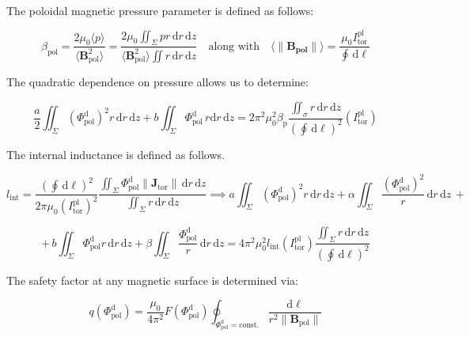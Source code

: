 The poloidal magnetic pressure parameter is defined as follows:

\begin{equation}
    \beta_\text{pol}=\frac{2\mu_0\langle p\rangle}{\langle\mathbf{B}_\text{pol}^2\rangle}=\frac{2\mu_0\iint_\Sigma pr\,\mathrm{d}r\,\mathrm{d}z}{\langle\mathbf B_\text{pol}^2\rangle\iint r\,\mathrm{d}r\,\mathrm{d}z}\quad\text{along with}\quad\langle\mathbf{\|\mathbf{B}_\text{pol}\|\rangle}=\frac{\mu_0I_\text{tor}^\text{pl}}{\oint\,\mathrm{d}\ell}
\end{equation}

The quadratic dependence on pressure allows us to determine:

\begin{equation}
    \frac{a}{2}\iint_\Sigma\left(\Phi_\text{pol}^\mathrm{d}\right)^2r\,\mathrm{d}r\,\mathrm{d}z+b\iint_\Sigma\Phi_\text{pol}^\mathrm{d}\,r\mathrm{d}r\,\mathrm{d}z=2\pi^2\mu_0^2\beta_\text{p}\frac{\iint_\sigma r\,\mathrm{d}r\,\mathrm{d}z}{\left(\oint\,\mathrm{d}\ell\right)^2}\left(I_\text{tor}^\text{pl}\right)
\end{equation}

The internal inductance is defined as follows.

\begin{equation}
    l_\text{int}=\frac{\left(\oint\,\mathrm{d}\ell\right)^2}{2\pi\mu_0\left(I_\text{tor}^\text{pl}\right)^2}\frac{\iint_\Sigma\Phi_\text{pol}^\mathrm{d}\|\mathbf{J}_\text{tor}\|\,\mathrm{d}r\,\mathrm{d}z}{\iint_\Sigma r\,\mathrm{d}r\,\mathrm{d}z}\implies a\iint_\Sigma\left(\Phi_\text{pol}^\mathrm{d}\right)^2r\,\mathrm{d}r\,\mathrm{d}z+\alpha\iint_\Sigma\frac{(\Phi_\text{pol}^\mathrm{d})^2}{r}\,\mathrm{d}r\,\mathrm{d}z\,+
\end{equation}

\begin{equation}
    +\,b\iint_\Sigma\Phi_\text{pol}^\mathrm{d}r\,\mathrm{d}r\,\mathrm{d}z+\beta\iint_\Sigma\frac{\Phi_\text{pol}^\mathrm{d}}{r}\,\mathrm{d}r\,\mathrm{d}z=4\pi^2\mu_0^2l_\text{int}\left(I_\text{tor}^\text{pl}\right)\frac{\iint_\Sigma r\,\mathrm{d}r\,\mathrm{d}z}{\left(\oint\,\mathrm{d}\ell\right)^2}
\end{equation}

The safety factor at any magnetic surface is determined via:

\begin{equation}
    q(\Phi_\text{pol}^\mathrm{d})=\frac{\mu_0}{4\pi^2}F(\Phi_\text{pol}^\mathrm{d})\oint_{\Phi_\text{pol}^\mathrm{d}=\text{const.}}\frac{\mathrm{d}\ell}{r^2\|\mathbf{B}_\text{pol}\|}
\end{equation}

